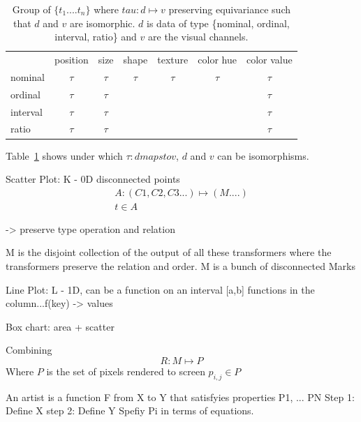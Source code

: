 \documentclass[letterpaper,onecolumn,titlepage]{Ythesis}
\begin{document}
\begin{table}
    \label{tab:taus}
    \begin{tabular}{l*{6}{c}} 
                              & position &  size  & shape & texture & color hue & color value  \\
    nominal                   & $\tau$   & $\tau$ & $\tau$& $\tau$  & $\tau$    & $\tau$       \\
    ordinal                   & $\tau$   & $\tau$ &       &         &           & $\tau$  \\
    interval                  & $\tau$   & $\tau$ &       &         &           & $\tau$  \\
    ratio                     & $\tau$   & $\tau$ &       &         &           & $\tau$ \\  
    \end{tabular}
\caption{Group of $\{t_{1}....t_{n}\}$ where $tau: d \mapsto v$ preserving equivariance such that $d$ and $v$ are isomorphic. $d$ is data of type \{nominal, ordinal, interval, ratio\} and $v$ are the visual channels. \cite{bertinIIPropertiesGraphic2011,munznerMarksChannels}}
\end{table}
 

Table~\ref{tab:taus} shows under which $\tau: d maps to v$, $d$ and $v$ can be isomorphisms.


Scatter Plot:
K - 0D disconnected points
\begin{multline}
A: (C1, C2, C3...)\mapsto (M....)\\
t \in A 
\end{multline}

-> preserve type operation and relation

M is the disjoint collection of the output of all these transformers where the transformers preserve the relation and order. M is a bunch of disconnected Marks

Line Plot:
L - 1D, can be a function on an interval [a,b]
functions in the column...f(key) -> values

Box chart: area + scatter 


Combining 
\begin{equation}
    \label{eg:renderer}
    R: M \mapsto P
\end{equation}
Where $P$ is the set of pixels rendered to screen ${p_{i,j} \in P}$


An artist is a function F from X to Y
that satisfyies properties P1, ... PN
Step 1: Define X
step 2: Define Y
Spefiy Pi in terms of equations.


\printbibliography
\end{document}
